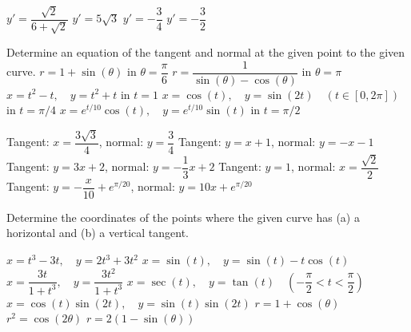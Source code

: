 \begin{Answer}\phantom{}
    \begin{multicols}{2}
		
    	\Question $y'= \dfrac{\sqrt{2}}{6+\sqrt{2}}$ 
    	\Question $y'= 5 \sqrt{3}$ 
		\Question $y'= -\dfrac{3}{4}$ 
		\Question $y'= -\dfrac{3}{2}$ 
		\EndCurrentQuestion
	\end{multicols}
\end{Answer}	
	

\begin{Exercise} Determine an equation of the tangent and normal at the given point to the given curve. 
    \ifanalysis\Question[difficulty = 1]\fi\ifcalculus\Question[difficulty = 2]\fi $r=1+\sin(\theta) $ \quad in $\theta = \dfrac{ \pi}{6}$
    \ifanalysis\Question[difficulty = 1]\fi\ifcalculus\Question[difficulty = 2]\fi $r=\dfrac{1}{\sin(\theta)-\cos(\theta)} $ \quad in $\theta = \pi$ 
    \Question[difficulty = 1] $x = t^2-t, \quad y=t^2+t$ \quad in $t=1$ 
    \Question[difficulty = 1] $x = \cos(t), \quad y=\sin \left( 2t \right) \quad \left(t \in [0,2\pi] \right)$ \quad in $t=\pi/4$
     \Question[difficulty = 1] $x = e^{t/10}\cos(t), \quad y=e^{t/10} \sin \left(t \right) $ \quad in $t=\pi/2$ 
     
\end{Exercise}

\begin{Answer}\phantom{}
    
           \Question Tangent: $x=\dfrac{3\sqrt{3}}{4}$, \quad normal: $y=\dfrac{3}{4}$ 
           \Question Tangent: $y=x+1$, \quad normal: $y=-x-1$ 
           \Question Tangent: $y=3x+2$, \quad normal: $y=-\dfrac{1}{3}x+2$ 
           \Question Tangent: $y=1$, \quad normal: $x= \dfrac{\sqrt{2}}{2}$ 
           \Question Tangent: $y=-\dfrac{x}{10} + e^{\pi/20}$, \quad normal: $y=10x + e^{\pi/20}$
        
\end{Answer}


\begin{Exercise} Determine the coordinates of the points where the given curve has (a) a horizontal  and (b) a vertical tangent.
	\begin{multicols}{2}
		\Question[difficulty = 1] $x = t^3-3t, \quad y=2t^3+3t^2$ 
		\Question[difficulty = 1] $x = \sin (t), \quad y=\sin (t) - t \cos (t) $
		\Question[difficulty = 1] $x = \dfrac{3t}{1+t^3}, \quad y = \dfrac{3t^2}{1+t^3}$ 
		\Question[difficulty = 1] $x = \sec (t), \quad y=\tan(t) \quad \left(-\dfrac{\pi}{2} < t < \dfrac{\pi}{2} \right)$
		\Question[difficulty = 2] $x = \cos (t)\sin \left( 2t \right) , \quad y=\sin(t)\sin \left( 2t \right)$ 
		\Question[difficulty = 2] $r = 1 + \cos (\theta)$ 
		\Question[difficulty = 2] $r^2 = \cos (2 \theta)$
		\Question[difficulty = 2] $r = 2(1-\sin (\theta))$ 
		\EndCurrentQuestion
	\end{multicols}
	
\end{Exercise}

